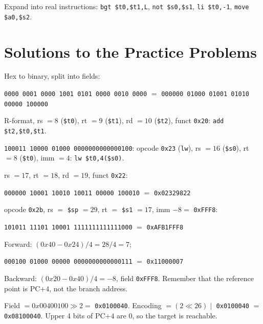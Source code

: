 \documentclass[11pt]{article}
\newcommand{\enc}[2]{\par{\centering\texttt{#1} $=$ \texttt{#2}\par}}
\begin{document}
\begin{exercise}\label{p:pseudo}
Expand into real instructions: \texttt{bgt \$t0,\$t1,L},
\texttt{not \$s0,\$s1}, \texttt{li \$t0,-1}, \texttt{move \$a0,\$s2}.
\end{exercise}

\section{Solutions to the Practice Problems}

\begin{solution}[\ref{p:dec1}]
Hex to binary, split into fields:
\enc{0000 0001 0000 1001 0101 0000 0010 0000}{000000 01000 01001 01010 00000 100000}
R-format, rs $=8$
(\texttt{\$t0}), rt $=9$ (\texttt{\$t1}), rd $=10$ (\texttt{\$t2}), funct
\texttt{0x20}: \texttt{add \$t2,\$t0,\$t1}.
\end{solution}

\begin{solution}[\ref{p:dec2}]
\texttt{100011 10000 01000 0000000000000100}: opcode \texttt{0x23}
(\texttt{lw}), rs $=16$ (\texttt{\$s0}), rt $=8$ (\texttt{\$t0}), imm $=4$:
\texttt{lw \$t0,4(\$s0)}.
\end{solution}

\begin{solution}[\ref{p:enc1}]
rs $=17$, rt $=18$, rd $=19$, funct \texttt{0x22}:
\enc{000000 10001 10010 10011 00000 100010}{0x02329822}
\end{solution}

\begin{solution}[\ref{p:enc2}]
opcode \texttt{0x2b}, rs $=$ \texttt{\$sp} $=29$, rt $=$ \texttt{\$s1} $=17$, imm $-8=$
\texttt{0xFFF8}:
\enc{101011 11101 10001 1111111111111000}{0xAFB1FFF8}
\end{solution}

\begin{solution}[\ref{p:branch}]
Forward: $(0x40-0x24)/4 = 28/4 = 7$;
\enc{000100 01000 00000 0000000000000111}{0x11000007}
Backward: $(0x20 - 0x40)/4 = -8$, field \texttt{0xFFF8}. Remember that the
reference point is PC$+4$, not the branch address.
\end{solution}

\begin{solution}[\ref{p:jump}]
Field $= 0x00400100 \gg 2 = $ \texttt{0x0100040}. Encoding $=(2\ll26)\mid$
\texttt{0x0100040} $=$ \texttt{0x08100040}. Upper 4 bits of PC$+4$ are 0, so
the target is reachable.
\end{solution}
\end{document}
